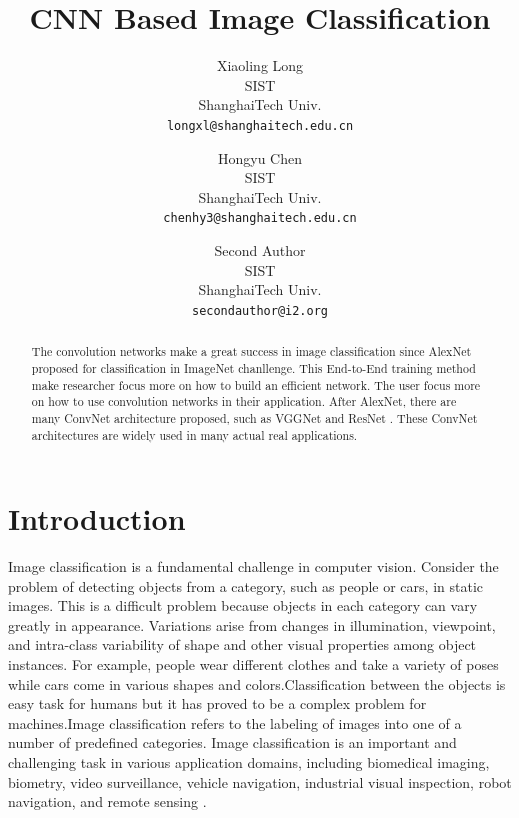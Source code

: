 \documentclass[10pt,twocolumn,letterpaper]{article}
\begin{document}
\title{	CNN Based Image Classification}

\author{Xiaoling Long\\
SIST\\
ShanghaiTech Univ.\\
{\tt\small longxl@shanghaitech.edu.cn}
\and
Hongyu Chen\\
SIST\\
ShanghaiTech Univ.\\
{\tt\small chenhy3@shanghaitech.edu.cn}
\and
Second Author\\
SIST\\
ShanghaiTech Univ.\\
{\tt\small secondauthor@i2.org}
}


\maketitle

\begin{abstract}
   The convolution networks make a great success in image classification since AlexNet \cite{krizhevsky2012imagenet} proposed for classification in ImageNet chanllenge. This End-to-End training method make researcher focus more on how to build an efficient network. The user focus more on how to use convolution networks in their application. After AlexNet, there are many ConvNet architecture proposed, such as VGGNet \cite{simonyan2014very} and ResNet \cite{he2016deep}. These ConvNet architectures are widely  used in many actual real applications.
\end{abstract}

\section{Introduction}
Image classification is a fundamental challenge in computer vision\cite{felzenszwalb2013visual}. Consider the problem of detecting objects from a category, such as people or cars, in static images. This is a difficult problem because objects in each category can vary greatly in appearance. Variations arise from changes in illumination, viewpoint, and intra-class variability of shape and other visual properties among object instances. For example, people wear different clothes and take a variety of poses while cars come in various shapes and colors.Classification   between   the   objects   is   easy   task   for  humans  but  it  has  proved  to  be  a  complex  problem for machines.Image classification refers to the labeling of images into one of a number of predefined categories.
Image classification is an important and challenging task in various application domains, including biomedical imaging, biometry, video surveillance, vehicle navigation, industrial visual inspection, robot navigation, and remote sensing \cite{kamavisdar2013survey}.
\end{document}
